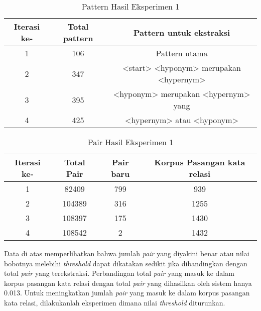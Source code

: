 \begin{table}
  \centering
  \caption{Pattern Hasil Eksperimen 1}
  \label{table:eksp1-pattern}
  \begin{tabular}{|c|c|c|}
  \hline
  Iterasi ke- & Total pattern & Pattern untuk ekstraksi                 \\ \hline
  1           & 106           & Pattern utama                           \\ \hline
  2           & 347           & <start> <hyponym> merupakan <hypernym>  \\ \hline
  3           & 395           & <hyponym> merupakan <hypernym> yang     \\ \hline
  4           & 425           & <hypernym> atau <hyponym>               \\ \hline
  \end{tabular} 
\end{table}

\begin{table}
  \centering
  \caption{Pair Hasil Eksperimen 1}
  \label{table:eksp1-pair}
  \begin{tabular}{|c|c|c|c|}
  \hline
  Iterasi ke-  & Total Pair & Pair baru & Korpus Pasangan kata relasi \\ \hline
  1            & 82409      & 799       & 939  \\ \hline
  2            & 104389     & 316       & 1255 \\ \hline
  3            & 108397     & 175       & 1430 \\ \hline
  4            & 108542     & 2         & 1432 \\ \hline
  \end{tabular} 
\end{table}

Data di atas memperlihatkan bahwa jumlah \textit{pair} yang diyakini benar atau nilai bobotnya melebihi \textit{threshold} dapat dikatakan sedikit jika dibandingkan dengan total \textit{pair} yang terekstraksi. Perbandingan total \textit{pair} yang masuk ke dalam korpus pasangan kata relasi dengan total \textit{pair} yang dihasilkan oleh sistem hanya 0.013. Untuk meningkatkan jumlah \textit{pair} yang masuk ke dalam korpus pasangan kata relasi, dilakukanlah eksperimen dimana nilai \textit{threshold} diturunkan.


